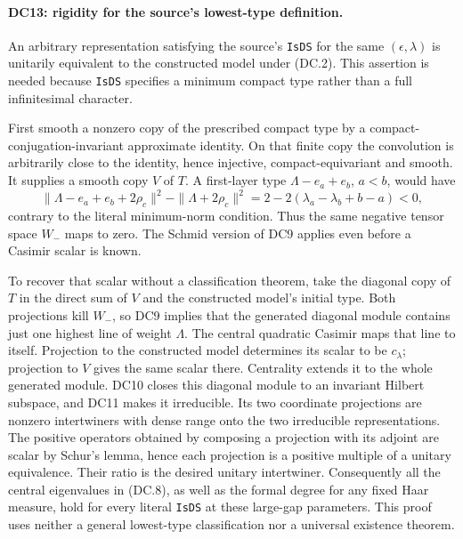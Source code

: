 \paragraph{DC13: rigidity for the source's lowest-type definition.}
\label{claim:DC13}
An arbitrary representation satisfying the source's \texttt{IsDS}
for the same $(\epsilon,\lambda)$ is unitarily equivalent to the
constructed model under (DC.2).  This assertion is needed because
\texttt{IsDS} specifies a minimum compact type rather than a full
infinitesimal character.

First smooth a nonzero copy of the prescribed compact type by a
compact-conjugation-invariant approximate identity.  On that finite
copy the convolution is arbitrarily close to the identity, hence
injective, compact-equivariant and smooth.  It supplies a smooth
copy $V$ of $T$.  A first-layer type $\Lambda-e_a+e_b$, $a<b$,
would have
\[
 \|\Lambda-e_a+e_b+2\rho_c\|^2
       -\|\Lambda+2\rho_c\|^2
       =2-2(\lambda_a-\lambda_b+b-a)<0,
\]
contrary to the literal minimum-norm condition.  Thus the same
negative tensor space $W_-$ maps to zero.  The Schmid version of DC9
applies even before a Casimir scalar is known.

To recover that scalar without a classification theorem, take the
diagonal copy of $T$ in the direct sum of $V$ and the constructed
model's initial type.  Both projections kill $W_-$, so DC9 implies
that the generated diagonal module contains just one highest line
of weight $\Lambda$.  The central quadratic Casimir maps that line
to itself.  Projection to the constructed model determines its
scalar to be $c_\lambda$; projection to $V$ gives the same scalar
there.  Centrality extends it to the whole generated module.
DC10 closes this diagonal module to an invariant Hilbert subspace,
and DC11 makes it irreducible.  Its two coordinate projections are
nonzero intertwiners with dense range onto the two irreducible
representations.  The positive operators obtained by composing a
projection with its adjoint are scalar by Schur's lemma, hence each
projection is a positive multiple of a unitary equivalence.
Their ratio is the desired unitary intertwiner.  Consequently all
the central eigenvalues in (DC.8), as well as the formal degree for
any fixed Haar measure, hold for every literal \texttt{IsDS} at
these large-gap parameters.  This proof uses neither a general
lowest-type classification nor a universal existence theorem.

